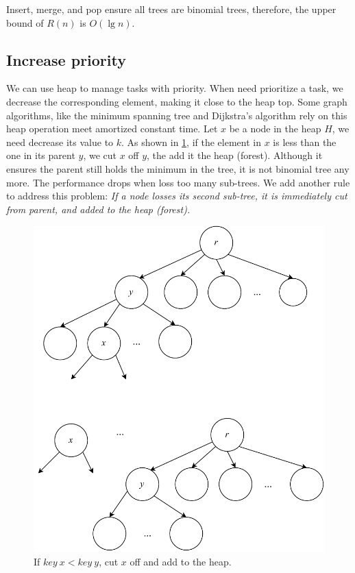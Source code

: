 \documentclass[b5paper]{article}
\begin{document}
Insert, merge, and pop ensure all trees are binomial trees, therefore, the upper bound of $R(n)$ is $O(\lg n)$.

\subsection{Increase priority}

We can use heap to manage tasks with priority. When need prioritize a task, we decrease the corresponding element, making it close to the heap top. Some graph algorithms, like the minimum spanning tree and Dijkstra's algorithm rely on this heap operation\cite{CLRS} meet amortized constant time. Let $x$ be a node in the heap $H$, we need decrease its value to $k$. As shown in \cref{fig:cut-fib-tree}, if the element in $x$ is less than the one in its parent $y$, we cut $x$ off $y$, the add it the heap (forest). Although it ensures the parent still holds the minimum in the tree, it is not binomial tree any more. The performance drops when loss too many sub-trees. We add another rule to address this problem: {\em If a node losses its second sub-tree, it is immediately cut from parent, and added to the heap (forest).}

\begin{figure}[htbp]
  \centering
  \includegraphics[scale=0.5]{img/fib-cut-past}
  \caption{If $key\ x < key\ y$, cut $x$ off and add to the heap.}
  \label{fig:cut-fib-tree}
\end{figure}
\end{document}
